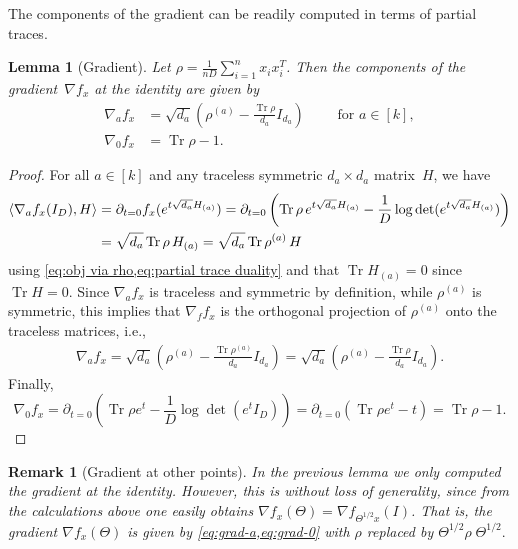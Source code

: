 \documentclass[aos]{imsart}
\newtheorem{lemma}[theorem]{Lemma}
\newtheorem{remark}[theorem]{Remark}
\theoremstyle{definition}
\numberwithin{equation}{section}
\DeclareMathOperator{\tr}{Tr}
\newcommand{\samp}{x}
\newcommand{\ef}{f}
\begin{document}
The components of the gradient can be readily computed in terms of partial traces.

\begin{lemma}[Gradient]\label{lem:gradient}
Let $\rho = \frac{1}{nD} \sum_{i=1}^n \samp_i \samp_i^T $.
Then the components of the gradient~$\nabla f_x$ at the identity are given by
\begin{align}
 \nabla_a \ef_{\samp} &= \sqrt{d_a}\left( \rho^{(a)} - \frac{\tr\rho}{d_a} I_{d_a}\right)
  \qquad \text{ for } a \in [k], \label{eq:grad-a}\\
  \nabla_0 \ef_\samp &= \tr \rho - 1.\label{eq:grad-0}
\end{align}
\end{lemma}
\begin{proof}
For all $a\in[k]$ and any traceless symmetric $d_a\times d_a$ matrix~$H$, we have
\begin{align*}
\braket{\nabla_a f_x(I_D), H}
&= \partial_{t=0} f_x(e^{t\sqrt{d_a} H_{(a)}})
= \partial_{t=0} \left( \tr \rho \, e^{t\sqrt{d_a} H_{(a)}} - \frac1D\log\det(e^{t\sqrt{d_a} H_{(a)}}) \right) \\
&= \sqrt{d_a} \tr \rho \, H_{(a)}
= \sqrt{d_a} \tr \rho^{(a)} \, H
\end{align*}
using \cref{eq:obj via rho,eq:partial trace duality} and that $\tr H_{(a)} = 0$ since $\tr H = 0$.
Since $\nabla_a f_{\samp}$ is traceless and symmetric by definition, while $\rho^{(a)}$ is symmetric, this implies that $\nabla_f f_{\samp}$ is the orthogonal projection of $\rho^{(a)}$ onto the traceless matrices, i.e.,
\begin{align*}
  \nabla_a f_{\samp}
= \sqrt{d_a} \left( \rho^{(a)} - \frac{\tr \rho^{(a)}}{d_a} I_{d_a} \right)
= \sqrt{d_a} \left( \rho^{(a)} - \frac{\tr \rho}{d_a} I_{d_a} \right).
\end{align*}
Finally,
\[
  \nabla_0 f_x
= \partial_{t=0} \left( \tr \rho e^t - \frac1D \log \det(e^t I_D) \right)
= \partial_{t=0} \left( \tr \rho e^t - t \right)
= \tr \rho - 1.
\]
\end{proof}

\begin{remark}[Gradient at other points]\label{remark:gradient-everywhere}
    In the previous lemma we only computed the gradient at the identity. However, this is without loss of generality, since from the calculations above one easily obtains $\nabla f_{x}(\Theta) = \nabla f_{\Theta^{1/2} x}(I)$. That is, the gradient $\nabla f_{x}(\Theta)$ is given by \cref{eq:grad-a,eq:grad-0} with $\rho$ replaced by $\Theta^{1/2}\rho\; \Theta^{1/2}.$
\end{remark}
\end{document}
